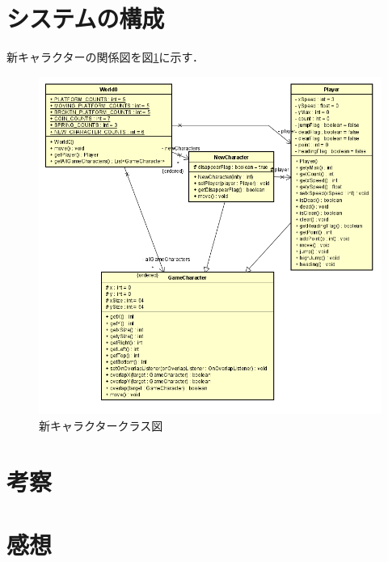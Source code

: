 \documentclass[titlepage,dvipdfmx]{jarticle}
\begin{document}
\section{システムの構成}
新キャラクターの関係図を図\ref{class}に示す．
\begin{figure}[H]
  \centering
  \includegraphics[width=12cm]{img/class.png}
  \caption{新キャラクタークラス図}
  \label{class}
\end{figure}

\section{考察}
\section{感想}
\end{document}
